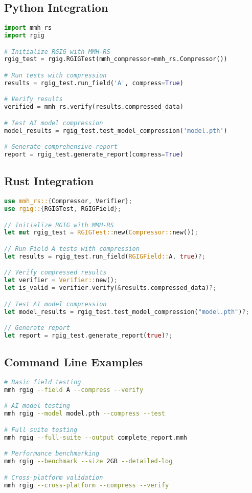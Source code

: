 \documentclass[12pt,a4paper]{article}
\begin{document}
\subsection{Python Integration}
\begin{lstlisting}[language=Python, caption=RGIG Python Integration]
import mmh_rs
import rgig

# Initialize RGIG with MMH-RS
rgig_test = rgig.RGIGTest(mmh_compressor=mmh_rs.Compressor())

# Run tests with compression
results = rgig_test.run_field('A', compress=True)

# Verify results
verified = mmh_rs.verify(results.compressed_data)

# Test AI model compression
model_results = rgig_test.test_model_compression('model.pth')

# Generate comprehensive report
report = rgig_test.generate_report(compress=True)
\end{lstlisting}

\subsection{Rust Integration}
\begin{lstlisting}[language=Rust, caption=RGIG Rust Integration]
use mmh_rs::{Compressor, Verifier};
use rgig::{RGIGTest, RGIGField};

// Initialize RGIG with MMH-RS
let mut rgig_test = RGIGTest::new(Compressor::new());

// Run Field A tests with compression
let results = rgig_test.run_field(RGIGField::A, true)?;

// Verify compressed results
let verifier = Verifier::new();
let is_valid = verifier.verify(&results.compressed_data)?;

// Test AI model compression
let model_results = rgig_test.test_model_compression("model.pth")?;

// Generate report
let report = rgig_test.generate_report(true)?;
\end{lstlisting}

\subsection{Command Line Examples}
\begin{lstlisting}[language=bash, caption=Command Line Examples]
# Basic field testing
mmh rgig --field A --compress --verify

# AI model testing
mmh rgig --model model.pth --compress --test

# Full suite testing
mmh rgig --full-suite --output complete_report.mmh

# Performance benchmarking
mmh rgig --benchmark --size 2GB --detailed-log

# Cross-platform validation
mmh rgig --cross-platform --compress --verify
\end{lstlisting}
\end{document}
